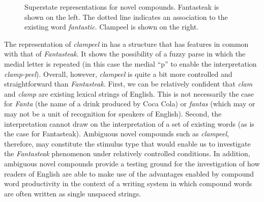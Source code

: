 \documentclass[output=paper]{langsci/langscibook}
\begin{document}
\begin{figure} 
    \centering
    \begin{minipage}{.5\linewidth}%
    \end{minipage}\begin{minipage}{.5\linewidth}%
    \end{minipage}
\caption{\label{fig:libben:3}Superstate representations for novel compounds. Fantasteak is shown on the left.  The dotted line indicates an association to the existing word \textit{fantastic}.  Clampeel is shown on the right.}
\end{figure}

The representation of \textit{clampeel} in  has a structure that has features in common with that of \textit{Fantasteak}.  It shows the possibility of a fuzzy parse in which the medial letter is repeated (in this case the medial “p” to enable the interpretation \textit{clamp-peel}).  Overall, however, \textit{clampeel} is quite a bit more controlled and straightforward than \textit{Fantasteak}. First, we can be relatively confident that \textit{clam} and \textit{clamp} are existing lexical strings of English. This is not necessarily the case for \textit{Fanta} (the name of a drink produced by Coca Cola) or \textit{fantas} (which may or may not be a unit of recognition for speakers of English). Second, the interpretation cannot draw on the interpretation of a set of existing words (as is the case for Fantasteak).  Ambiguous novel compounds such as \textit{clampeel}, therefore, may constitute the stimulus type that would enable us to investigate the \textit{Fantasteak} phenomenon under relatively controlled conditions. In addition, ambiguous novel compounds provide a testing ground for the investigation of how readers of English are able to make use of the advantages enabled by compound word productivity in the context of a writing system in which compound words are often written as single unspaced strings. 
\end{document}

